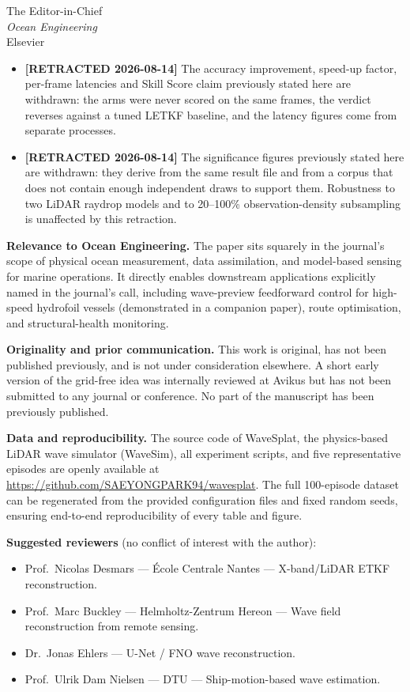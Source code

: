\documentclass[11pt,a4paper]{letter}
\begin{document}
\begin{letter}{The Editor-in-Chief \\ \textit{Ocean Engineering} \\ Elsevier}
\begin{itemize}
  \item \textbf{[RETRACTED 2026-08-14]} The accuracy improvement, speed-up
        factor, per-frame latencies and Skill Score claim previously stated
        here are withdrawn: the arms were never scored on the same frames,
        the verdict reverses against a tuned LETKF baseline, and the latency
        figures come from separate processes.
  \item \textbf{[RETRACTED 2026-08-14]} The significance figures previously
        stated here are withdrawn: they derive from the same result file and
        from a corpus that does not contain enough independent draws to
        support them. Robustness to two LiDAR raydrop models and to
        20--100\% observation-density subsampling is unaffected by this
        retraction.
\end{itemize}

\textbf{Relevance to Ocean Engineering.} The paper sits squarely in
the journal's scope of physical ocean measurement, data assimilation,
and model-based sensing for marine operations. It directly enables
downstream applications explicitly named in the journal's call,
including wave-preview feedforward control for high-speed hydrofoil
vessels (demonstrated in a companion paper), route optimisation, and
structural-health monitoring.

\textbf{Originality and prior communication.} This work is original,
has not been published previously, and is not under consideration
elsewhere. A short early version of the grid-free idea was
internally reviewed at Avikus but has not been submitted to any
journal or conference. No part of the manuscript has been previously
published.

\textbf{Data and reproducibility.} The source code of WaveSplat, the
physics-based LiDAR wave simulator (WaveSim), all experiment scripts,
and five representative episodes are openly available at
\url{https://github.com/SAEYONGPARK94/wavesplat}. The full 100-episode
dataset can be regenerated from the provided configuration files and
fixed random seeds, ensuring end-to-end reproducibility of every
table and figure.

\textbf{Suggested reviewers} (no conflict of interest with the
author):
\begin{itemize}
  \item Prof.\ Nicolas Desmars --- École Centrale Nantes ---
        X-band/LiDAR ETKF reconstruction.
  \item Prof.\ Marc Buckley --- Helmholtz-Zentrum Hereon ---
        Wave field reconstruction from remote sensing.
  \item Dr.\ Jonas Ehlers --- U-Net / FNO wave reconstruction.
  \item Prof.\ Ulrik Dam Nielsen --- DTU --- Ship-motion-based wave
        estimation.
\end{itemize}


\end{letter}
\end{document}
